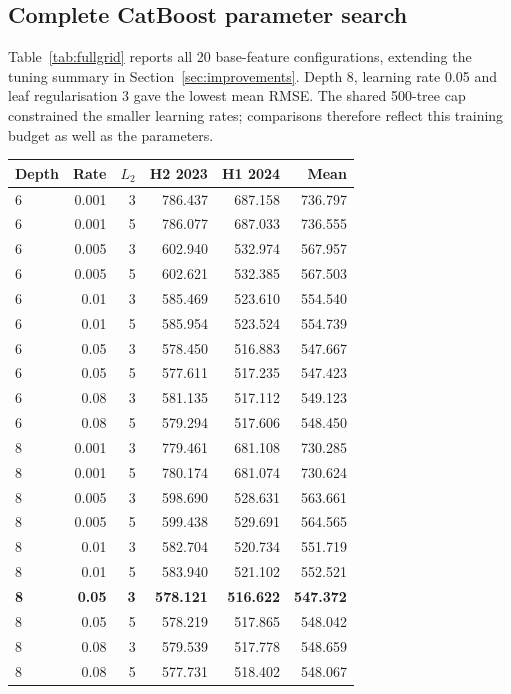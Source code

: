 \documentclass[conference]{IEEEtran}
\makeatletter
\newenvironment{localtable}{\par\addvspace{\medskipamount}\noindent
  \begin{minipage}{\columnwidth}\def\@captype{table}}{\end{minipage}\par
  \addvspace{\medskipamount}}
\makeatother
\begin{document}
\subsection{Complete CatBoost parameter search}
Table~\ref{tab:fullgrid} reports all 20 base-feature configurations, extending
the tuning summary in Section~\ref{sec:improvements}. Depth 8, learning rate
0.05 and leaf regularisation 3 gave the lowest mean RMSE. The shared
500-tree cap constrained the smaller learning rates; comparisons therefore
reflect this training budget as well as the parameters.
\begin{localtable}
  \caption{Full CatBoost grid on 35 base inputs. H2 2023 and H1 2024 denote the two selection windows; bold marks the selected configuration.}
  \label{tab:fullgrid}
  \centering\small
  \setlength{\tabcolsep}{3pt}
  \begin{tabularx}{\columnwidth}{Xrrrrr}
    \toprule
Depth & Rate & $L_2$ & H2 2023 & H1 2024 & Mean \\
    \midrule
6 & 0.001 & 3 & 786.437 & 687.158 & 736.797 \\
6 & 0.001 & 5 & 786.077 & 687.033 & 736.555 \\
6 & 0.005 & 3 & 602.940 & 532.974 & 567.957 \\
6 & 0.005 & 5 & 602.621 & 532.385 & 567.503 \\
6 & 0.01 & 3 & 585.469 & 523.610 & 554.540 \\
6 & 0.01 & 5 & 585.954 & 523.524 & 554.739 \\
6 & 0.05 & 3 & 578.450 & 516.883 & 547.667 \\
6 & 0.05 & 5 & 577.611 & 517.235 & 547.423 \\
6 & 0.08 & 3 & 581.135 & 517.112 & 549.123 \\
6 & 0.08 & 5 & 579.294 & 517.606 & 548.450 \\
8 & 0.001 & 3 & 779.461 & 681.108 & 730.285 \\
8 & 0.001 & 5 & 780.174 & 681.074 & 730.624 \\
8 & 0.005 & 3 & 598.690 & 528.631 & 563.661 \\
8 & 0.005 & 5 & 599.438 & 529.691 & 564.565 \\
8 & 0.01 & 3 & 582.704 & 520.734 & 551.719 \\
8 & 0.01 & 5 & 583.940 & 521.102 & 552.521 \\
\textbf{8} & \textbf{0.05} & \textbf{3} & \textbf{578.121} & \textbf{516.622} & \textbf{547.372} \\
8 & 0.05 & 5 & 578.219 & 517.865 & 548.042 \\
8 & 0.08 & 3 & 579.539 & 517.778 & 548.659 \\
8 & 0.08 & 5 & 577.731 & 518.402 & 548.067 \\
    \bottomrule
  \end{tabularx}
\end{localtable}
\end{document}
